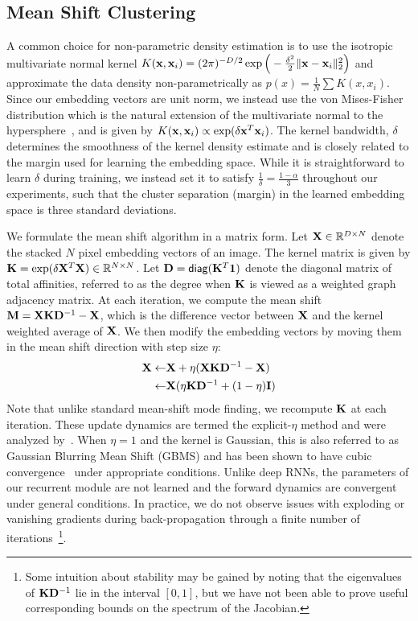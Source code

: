 \documentclass[10pt,twocolumn,letterpaper]{article}
\def\D{{\bf D}}
\def\K{{\bf K}}
\def\I{{\bf I}}
\def\X{{\bf X}}
\def\x{{\bf x}}
\def\M{{\bf M}}
\def\1{{\bf 1}}
\def\RB{{\mathbb R}}
\def\diag{\mathsf{diag}}
\begin{document}
\subsection{Mean Shift Clustering}
A common choice for non-parametric density estimation is to use the isotropic
multivariate normal kernel $K(\x, \x_i)= (2\pi)^{-D/2}\exp \Big(-
\frac{\delta^2}{2} \Vert\x - \x_i \Vert^2_2 \Big)$ and approximate the data
density non-parametrically as $p(x) = \frac{1}{N} \sum K(x,x_i)$. Since our
embedding vectors are unit norm, we instead use the von Mises-Fisher
distribution which is the natural extension of the multivariate normal to the
hypersphere~\cite{fisher1953dispersion,
banerjee2005clustering,mardia2009directional,kobayashi2010mises},
and is given by $K(\x,\x_i) \propto \exp( \delta \x^T \x_i )$.
The kernel bandwidth, $\delta$ determines the smoothness of the
kernel density estimate and is closely related to the margin used for learning
the embedding space. While it is straightforward to learn $\delta$ during
training, we instead set it to satisfy $\frac{1}{\delta}=\frac{1-\alpha}{3}$
throughout our experiments, such that the cluster separation (margin) in the
learned embedding space is three standard deviations.

We formulate the mean shift algorithm in a matrix form.  Let $\X \in
\RB^{D\times N}$ denote the stacked $N$ pixel embedding vectors of an image.
The kernel matrix is given by $\K = \exp(\delta \X^T\X) \in \RB^{N \times N}$.
Let $\D = \diag(\K^T\1)$ denote the diagonal matrix of total affinities,
referred to as the degree when $\K$ is viewed as a weighted graph
adjacency matrix. At each iteration, we compute the mean shift $\M =
\X\K\D^{-1} - \X$, which is the difference vector between $\X$ and the kernel
weighted average of $\X$. We then modify the embedding vectors by moving
them in the mean shift direction with step size $\eta$:
\begin{equation}
\begin{split}
\X \leftarrow & \X + \eta(\X\K\D^{-1} - \X)\\
\leftarrow & \X (\eta\K\D^{-1} + (1-\eta)\I)\\
\end{split}
\end{equation}
Note that unlike standard mean-shift mode finding, we recompute $\K$ at each
iteration.  These update dynamics are termed the explicit-$\eta$ method and
were analyzed by~\cite{carreira2008generalised}. When $\eta=1$ and the kernel
is Gaussian, this is also referred to as Gaussian Blurring Mean Shift (GBMS)
and has been shown to have cubic convergence~\cite{carreira2008generalised}
under appropriate conditions.  Unlike deep RNNs, the parameters of our
recurrent module are not learned and the forward dynamics are convergent under
general conditions.  In practice, we do not observe issues with exploding or
vanishing gradients during back-propagation through a finite number of
iterations~\footnote{Some intuition about stability may be gained by noting
that the eigenvalues of $\K\D^{-1}$ lie in the interval $[0,1]$, but we have
not been able to prove useful corresponding bounds on the spectrum of the
Jacobian.}.
\end{document}
